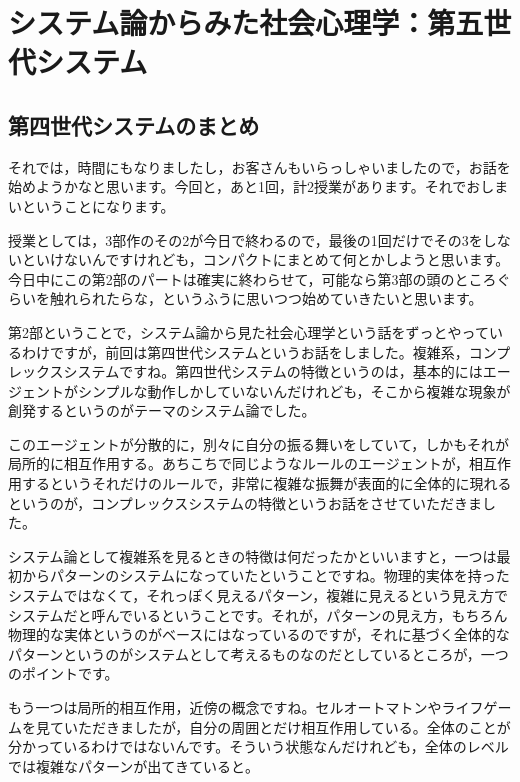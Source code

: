 \documentclass{ltjsbook}
\begin{document}
\setcounter{chapter}{10}
\chapter{システム論からみた社会心理学：第五世代システム}
\label{sp11_system}

\section{第四世代システムのまとめ}
それでは，時間にもなりましたし，お客さんもいらっしゃいましたので，お話を始めようかなと思います。今回と，あと1回，計2授業があります。それでおしまいということになります。

授業としては，3部作のその2が今日で終わるので，最後の1回だけでその3をしないといけないんですけれども，コンパクトにまとめて何とかしようと思います。今日中にこの第2部のパートは確実に終わらせて，可能なら第3部の頭のところぐらいを触れられたらな，というふうに思いつつ始めていきたいと思います。

第2部ということで，システム論から見た社会心理学という話をずっとやっているわけですが，前回は第四世代システムというお話をしました。複雑系，コンプレックスシステムですね。第四世代システムの特徴というのは，基本的にはエージェントがシンプルな動作しかしていないんだけれども，そこから複雑な現象が創発するというのがテーマのシステム論でした。

このエージェントが分散的に，別々に自分の振る舞いをしていて，しかもそれが局所的に相互作用する。あちこちで同じようなルールのエージェントが，相互作用するというそれだけのルールで，非常に複雑な振舞が表面的に全体的に現れるというのが，コンプレックスシステムの特徴というお話をさせていただきました。

システム論として複雑系を見るときの特徴は何だったかといいますと，一つは最初からパターンのシステムになっていたということですね。物理的実体を持ったシステムではなくて，それっぽく見えるパターン，複雑に見えるという見え方でシステムだと呼んでいるということです。それが，パターンの見え方，もちろん物理的な実体というのがベースにはなっているのですが，それに基づく全体的なパターンというのがシステムとして考えるものなのだとしているところが，一つのポイントです。

もう一つは局所的相互作用，近傍の概念ですね。セルオートマトンやライフゲームを見ていただきましたが，自分の周囲とだけ相互作用している。全体のことが分かっているわけではないんです。そういう状態なんだけれども，全体のレベルでは複雑なパターンが出てきていると。
\end{document}
